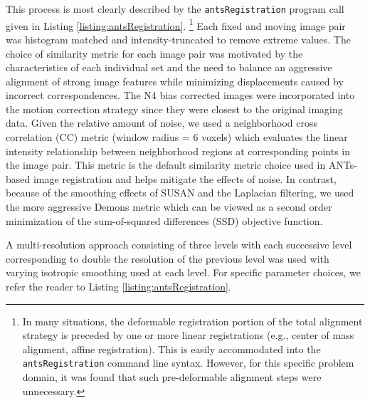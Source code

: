 \documentclass{llncs}
\begin{document}
This process is most clearly described by the {\tt antsRegistration} program call given in Listing 
\ref{listing:antsRegistration}.%
\footnote{
In many situations, the deformable registration portion of the total alignment strategy
is preceded by one or more linear registrations (e.g., center of mass alignment, affine 
registration).  This is easily accommodated into the {\tt antsRegistration} command line
syntax.  However, for this specific problem domain, it was found that such pre-deformable
alignment steps were unnecessary.
}  
Each fixed and moving image pair was histogram
matched \cite{nyul2000} and intensity-truncated to remove extreme values.  The
choice of similarity metric for each image pair was motivated by the characteristics
of each individual set and the need to balance an aggressive alignment of strong image features 
while minimizing displacements caused by incorrect correspondences.  The N4 bias corrected
images were incorporated into the motion correction strategy since they were closest
to the original imaging data. Given the relative amount of noise, we used a neighborhood
cross correlation (CC) metric (window radius = 6 voxels) which evaluates the linear
intensity relationship between neighborhood regions at corresponding points in the image 
pair.  This metric
is the default similarity metric choice used in ANTs-based image registration \cite{avants2008}
and helps mitigate the effects of noise.  In
contrast, because of the smoothing effects of SUSAN and the Laplacian filtering, 
we used the more aggressive Demons metric \cite{thirion1998} 
which can be viewed as a second order minimization of the sum-of-squared differences
(SSD) objective function.  

A multi-resolution approach
consisting of three levels with each successive level corresponding to double the resolution
of the previous level was used with varying isotropic smoothing used at each level.  For
specific parameter choices, we refer the reader to Listing 
\ref{listing:antsRegistration}.
\end{document}
